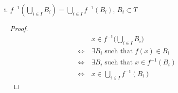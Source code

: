 \documentclass[12pt]{article}
\begin{document}
\begin{enumerate}[(a)]
\begin{enumerate}[(i)]
                  \item $f^{-1}(\bigcup_{i\in I} B_i) = \bigcup_{i\in I} f^{-1}(B_i)$,
                        $B_i \subset T$
                        \begin{proof}
                              \begin{align*}
                                                           & x \in f^{-1}\Big(\bigcup_{i\in I} B_i\Big)       \\
                                    \Longleftrightarrow \  & \exists B_i \text{ such that } f(x) \in B_i      \\
                                    \Longleftrightarrow \  & \exists B_i \text{ such that } x \in f^{-1}(B_i) \\
                                    \Longleftrightarrow \  & x \in \bigcup_{i\in I} f^{-1}(B_i)
                              \end{align*}
                        \end{proof}


\end{enumerate}
\end{enumerate}
\end{document}
